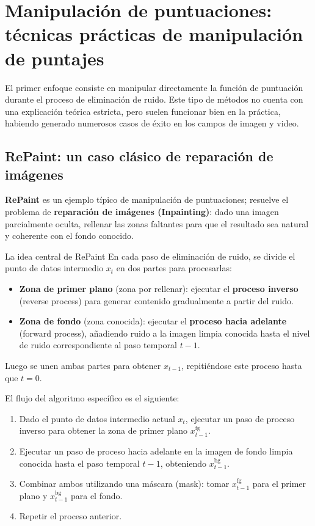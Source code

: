 \section{Manipulación de puntuaciones: técnicas prácticas de manipulación de puntajes}

El primer enfoque consiste en manipular directamente la función de puntuación durante el proceso de eliminación de ruido. Este tipo de métodos no cuenta con una explicación teórica estricta, pero suelen funcionar bien en la práctica, habiendo generado numerosos casos de éxito en los campos de imagen y video.

\subsection{RePaint: un caso clásico de reparación de imágenes}

\textbf{RePaint} es un ejemplo típico de manipulación de puntuaciones; resuelve el problema de \textbf{reparación de imágenes (Inpainting)}: dado una imagen parcialmente oculta, rellenar las zonas faltantes para que el resultado sea natural y coherente con el fondo conocido.

\begin{importantbox}{La idea central de RePaint}
En cada paso de eliminación de ruido, se divide el punto de datos intermedio $x_t$ en dos partes para procesarlas:
\begin{itemize}
    \item \textbf{Zona de primer plano} (zona por rellenar): ejecutar el \textbf{proceso inverso} (reverse process) para generar contenido gradualmente a partir del ruido.
    \item \textbf{Zona de fondo} (zona conocida): ejecutar el \textbf{proceso hacia adelante} (forward process), añadiendo ruido a la imagen limpia conocida hasta el nivel de ruido correspondiente al paso temporal $t-1$.
\end{itemize}
Luego se unen ambas partes para obtener $x_{t-1}$, repitiéndose este proceso hasta que $t=0$.
\end{importantbox}

El flujo del algoritmo específico es el siguiente:
\begin{enumerate}
    \item Dado el punto de datos intermedio actual $x_t$, ejecutar un paso de proceso inverso para obtener la zona de primer plano $x_{t-1}^{\text{fg}}$.
    \item Ejecutar un paso de proceso hacia adelante en la imagen de fondo limpia conocida hasta el paso temporal $t-1$, obteniendo $x_{t-1}^{\text{bg}}$.
    \item Combinar ambos utilizando una máscara (mask): tomar $x_{t-1}^{\text{fg}}$ para el primer plano y $x_{t-1}^{\text{bg}}$ para el fondo.
    \item Repetir el proceso anterior.
\end{enumerate}

